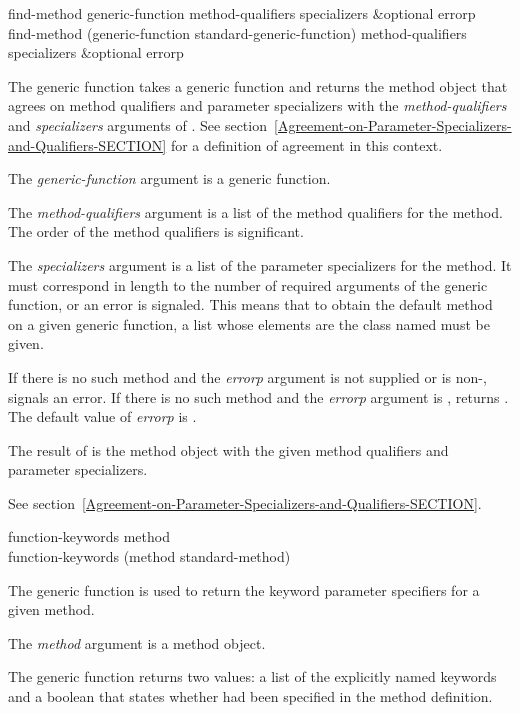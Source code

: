 \begin{defun}
find-method generic-function method-qualifiers specializers &optional errorp \\
find-method (generic-function standard-generic-function)
   method-qualifiers specializers &optional errorp

The generic function  takes a generic function and
returns the method object that agrees on method qualifiers and
parameter specializers with the \emph{method-qualifiers} and \emph{specializers}
arguments of . 
See section~\ref{Agreement-on-Parameter-Specializers-and-Qualifiers-SECTION} for a
definition of agreement in this context.

The \emph{generic-function} argument is a generic function.

The \emph{method-qualifiers} argument is a list of the
method qualifiers for the method.   The order of the method qualifiers
is significant.  

The \emph{specializers} argument is a list of the parameter
specializers for the method.  It must correspond in length to
the number of required arguments of the generic function, or
an error is signaled.  This means that to obtain the
default method on a given generic function, a list whose
elements are the class named  must be given.

If there is no such method and the \emph{errorp} argument is
not supplied or is non-,  signals an error.
If there is no such method and the \emph{errorp} argument is
,  returns .  The default value of
\emph{errorp} is .

The result of  is the method object with the given
method qualifiers and parameter specializers.

See section~\ref{Agreement-on-Parameter-Specializers-and-Qualifiers-SECTION}.
\end{defun}


\begin{defun}
function-keywords method \\
function-keywords (method standard-method)

The generic function  is used to return the keyword
parameter specifiers for a given method.

The \emph{method} argument is a method object.

The generic function  returns two values:
a list of the explicitly named keywords and a boolean that states whether
 had been specified in the method definition.
\end{defun}

